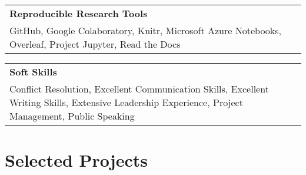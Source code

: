 \documentclass[10pt]{article}
\newcommand{\tabularxwidth}{\textwidth}
\begin{document}
        
            \vspace{.5em}
        

    
        \begin{tabularx}{\tabularxwidth}{X}
            \textbf{Reproducible Research Tools} \\
            
    
            GitHub, 
            Google Colaboratory, 
            Knitr, 
            Microsoft Azure Notebooks, 
            Overleaf, 
            Project Jupyter, 
            Read the Docs \\
        \end{tabularx}

        
            \vspace{.5em}
        

    
        \begin{tabularx}{\tabularxwidth}{X}
            \textbf{Soft Skills} \\
            
    
            Conflict Resolution, 
            Excellent Communication Skills, 
            Excellent Writing Skills, 
            Extensive Leadership Experience, 
            Project Management, 
            Public Speaking \\
        \end{tabularx}

        

    



    
        \section{Selected Projects}

    
\end{document}
